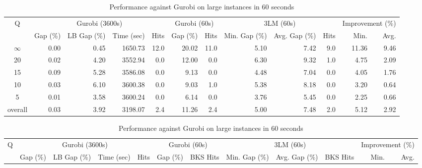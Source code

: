 \begin{table}[H]
\centering
\caption{Performance against Gurobi on large instances in 60 seconds}
\label{tab:3lm_resuts200T60}
\begin{tabular}{c rrrr rr rrr rr}
\toprule
       Q & \multicolumn{4}{c}{Gurobi (3600s)} & \multicolumn{2}{c}{Gurobi (60s)} & \multicolumn{3}{c}{3LM (60s)} & \multicolumn{2}{c}{Improvement (\%)} \\
         &       Gap (\%) & LB Gap (\%) & Time (sec) & Hits &     Gap (\%) & Hits & Min. Gap (\%) & Avg. Gap (\%) & Hits &             Min. & Avg. \\
\cmidrule(lr){1-1} \cmidrule(lr){2-5} \cmidrule(lr){2-5} \cmidrule(lr){6-7} \cmidrule(lr){8-10} \cmidrule(lr){11-12}
$\infty$ &           0.00 &        0.45 &    1650.73 & 12.0 &        20.02 & 11.0 &          5.10 &          7.42 &  9.0 &            11.36 & 9.46 \\
      20 &           0.02 &        4.20 &    3552.94 &  0.0 &        12.00 &  0.0 &          6.30 &          9.32 &  1.0 &             4.75 & 2.09 \\
      15 &           0.09 &        5.28 &    3586.08 &  0.0 &         9.13 &  0.0 &          4.48 &          7.04 &  0.0 &             4.05 & 1.76 \\
      10 &           0.03 &        6.10 &    3600.38 &  0.0 &         9.03 &  1.0 &          5.38 &          8.18 &  0.0 &             3.20 & 0.64 \\
       5 &           0.01 &        3.58 &    3600.24 &  0.0 &         6.14 &  0.0 &          3.76 &          5.45 &  0.0 &             2.25 & 0.66 \\
\midrule
 overall &           0.03 &        3.92 &    3198.07 &  2.4 &        11.26 &  2.4 &          5.00 &          7.48 &  2.0 &             5.12 & 2.92 \\
\bottomrule
\end{tabular}
\end{table}\begin{table}[H]
\centering
\caption{Performance against Gurobi on large instances in 60 seconds}
\label{tab:3lm_resuts200T60}
\begin{tabular}{c rrrr rr rrr rr}
\toprule
       Q & \multicolumn{4}{c}{Gurobi (3600s)} & \multicolumn{2}{c}{Gurobi (60s)} & \multicolumn{3}{c}{3LM (60s)} & \multicolumn{2}{c}{Improvement (\%)} \\
         &       Gap (\%) & LB Gap (\%) & Time (sec) & Hits &     Gap (\%) & BKS Hits & Min. Gap (\%) & Avg. Gap (\%) & BKS Hits &             Min. & Avg. \\

\end{tabular}
\end{table}
